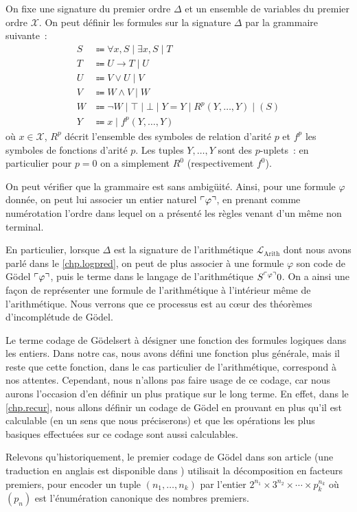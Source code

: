 \begin{example}
  On fixe une signature du premier ordre $\Delta$ et un ensemble de variables
  du premier ordre $\mathcal X$. On peut définir les formules sur la signature
  $\Delta$ par la grammaire suivante~:
  \begin{align*}
    S &\Coloneq \forall x, S \mid \exists x, S\mid T\\
    T &\Coloneq U \to T \mid U\\
    U &\Coloneq V \lor U \mid V\\
    V &\Coloneq W \land V \mid W\\
    W &\Coloneq \lnot W \mid \top \mid \bot \mid Y = Y \mid
    R^p(Y,\ldots,Y)\mid (S)\\
    Y &\Coloneq x \mid f^p(Y,\ldots,Y)
  \end{align*}
  où $x \in \mathcal X$, $R^p$ décrit l'ensemble des symboles de relation
  d'arité $p$ et $f^p$ les symboles de fonctions d'arité $p$. Les tuples
  $Y,\ldots,Y$ sont des $p$-uplets~: en particulier pour $p = 0$ on a simplement
  $R^0$ (respectivement $f^0$).
  
  On peut vérifier que la grammaire est sans ambigüité. Ainsi, pour une formule
  $\varphi$ donnée, on peut lui associer un entier naturel $\ulcorner\varphi\urcorner$, en
  prenant comme numérotation l'ordre dans lequel on a présenté les règles venant
  d'un même non terminal.

  En particulier, lorsque $\Delta$ est la signature de l'arithmétique
  $\mathcal L_{\mathrm{Arith}}$ dont nous avons parlé dans le
  \cref{chp.logpred}, on peut de plus associer à une formule $\varphi$ son
  code de Gödel $\ulcorner\varphi\urcorner$, puis le terme dans le langage de
  l'arithmétique $S^{\ulcorner\varphi\urcorner}0$. On a ainsi une façon de représenter une
  formule de l'arithmétique à l'intérieur même de l'arithmétique. Nous verrons
  que ce processus est au c\oe ur des théorèmes d'incomplétude de Gödel.
\end{example}

\begin{remark}
  Le terme \og codage de Gödel\fg sert à désigner une fonction des formules
  logiques dans les entiers. Dans notre cas, nous avons défini une fonction plus
  générale, mais il reste que cette fonction, dans le cas particulier de
  l'arithmétique, correspond à nos attentes. Cependant, nous n'allons pas
  faire usage de ce codage, car nous aurons l'occasion d'en définir un plus
  pratique sur le long terme. En effet, dans le \cref{chp.recur}, nous allons
  définir un codage de Gödel en prouvant en plus qu'il est calculable (en un
  sens que nous préciserons) et que les opérations les plus basiques effectuées
  sur ce codage sont aussi calculables.

  Relevons qu'historiquement, le premier codage de Gödel dans son article
  \cite{Godel1931-GDEBFU} (une traduction en anglais est disponible dans
  \cite{van1967frege}) utilisait la décomposition en facteurs premiers, pour
  encoder un tuple $(n_1,\ldots,n_k)$ par l'entier
  $2^{n_1}\times 3^{n_2}\times\cdots \times p_k^{n_k}$ où $(p_n)$ est l'énumération
  canonique des nombres premiers.
\end{remark}
  
